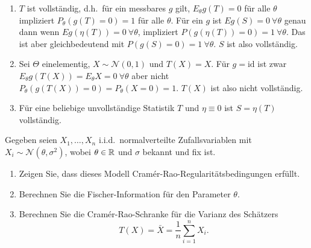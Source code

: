 \solution
\begin{enumerate}

    \item $T$ ist vollständig, d.h.\ für ein messbares $g$ gilt, $E_\theta g(T) = 0$ für alle $\theta$ impliziert 
        $P_\theta \left( g(T)=0  \right)=1$ für alle $\theta$. Für ein $g$ ist
        $E g(S)=0 \ \forall \theta$ genau dann wenn $E g(\eta(T))=0 \ \forall \theta$, impliziert
        $P\left( g(\eta(T))=0 \right)=1 \ \forall \theta$. Das ist aber gleichbedeutend mit 
        $P\left( g(S)=0 \right)=1 \ \forall \theta$. $S$ ist also vollständig. 

    \item Sei $\Theta$ einelementig, $X\sim \mathcal N(0,1)$ und $T(X)=X$. Für $g=\textrm{id}$ ist zwar
        $E_\theta g(T(X)) = E_\theta X = 0 \ \forall \theta$ aber nicht 
        $P_\theta \left( g(T(X))=0 \right)=  P_\theta \left( X=0 \right)=1$. $T(X)$ ist also nicht vollständig. 

    \item Für eine beliebige unvollständige Statistik $T$ und $\eta\equiv 0$ ist $S=\eta(T)$ vollständig. 

\end{enumerate}







 Gegeben seien $X_1,\ldots,X_n$
i.i.d.\ normalverteilte Zufallsvariablen mit $X_i\sim \mathcal N(\theta, \sigma^2)$, wobei $\theta\in\mathbb R$
und $\sigma$ bekannt und fix ist.
\begin{enumerate}
    \item Zeigen Sie, dass dieses Modell Cram\'er-Rao-Regularitätsbedingungen erfüllt.
    \item Berechnen Sie die Fischer-Information für den Parameter $\theta$.
    \item Berechnen Sie die Cram\'er-Rao-Schranke für die Varianz des Schätzers
        \begin{equation}
            T(X)=\bar X = \frac{1}{n} \sum_{i=1}^{n}X_i.
        \end{equation}
\end{enumerate}



